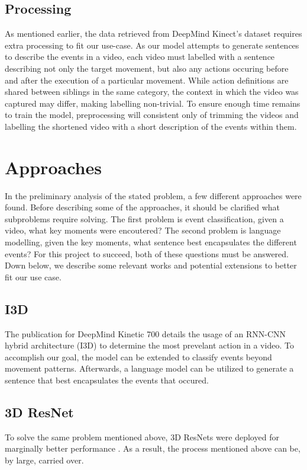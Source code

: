\documentclass[10pt]{article}
\begin{document}
\subsection{Processing}
As mentioned earlier, the data retrieved from DeepMind Kinect's dataset requires extra processing to fit our use-case.
As our model attempts to generate sentences to describe
the events in a video, each video must labelled with a sentence describing not only the target movement, but also
any actions occuring before and after the execution of a particular movement. While action definitions are shared between siblings
in the same category, the context in which the video was captured may differ, making labelling non-trivial.
To ensure enough time remains to train the model, preprocessing will consistent only of 
trimming the videos and labelling the shortened video with a short description of the events within them.

\section{Approaches}

In the preliminary analysis of the stated problem, a few different approaches were found. 
Before describing some of the approaches, it should be clarified what subproblems require solving.
The first problem is event classification, given a video, what key moments were encoutered?
The second problem is language modelling, given the key moments, what sentence best encapsulates 
the different events? For this project to succeed, both of these questions must be answered.
Down below, we describe some relevant works and potential extensions to better fit our use case. 

\subsection{I3D}
The publication for DeepMind Kinetic 700 details the usage of an RNN-CNN hybrid architecture (I3D) to determine 
the most prevelant action in a video. To accomplish our goal, the model can be extended to classify events beyond
movement patterns. Afterwards, a language model can be utilized to generate a sentence that best encapsulates the events that occured.

\subsection{3D ResNet}
To solve the same problem mentioned above, 3D ResNets were deployed for marginally better performance \cite{du2021revisiting}.
As a result, the process mentioned above can be, by large, carried over.
\end{document}

